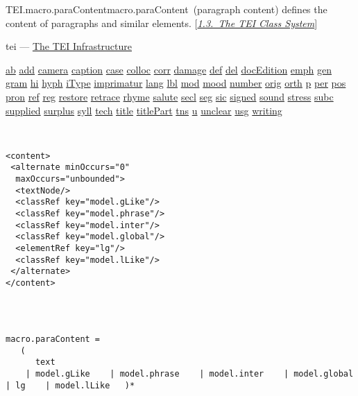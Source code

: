\begin{reflist}
\item[]\begin{specHead}{TEI.macro.paraContent}{macro.paraContent} (paragraph content) defines the content of paragraphs and similar elements. [\textit{\hyperref[STEC]{1.3.\ The TEI Class System}}]\end{specHead} 
    \item[{Module}]
  tei — \hyperref[ST]{The TEI Infrastructure}
    \item[{Used by}]
  \hyperref[TEI.ab]{ab} \hyperref[TEI.add]{add} \hyperref[TEI.camera]{camera} \hyperref[TEI.caption]{caption} \hyperref[TEI.case]{case} \hyperref[TEI.colloc]{colloc} \hyperref[TEI.corr]{corr} \hyperref[TEI.damage]{damage} \hyperref[TEI.def]{def} \hyperref[TEI.del]{del} \hyperref[TEI.docEdition]{docEdition} \hyperref[TEI.emph]{emph} \hyperref[TEI.gen]{gen} \hyperref[TEI.gram]{gram} \hyperref[TEI.hi]{hi} \hyperref[TEI.hyph]{hyph} \hyperref[TEI.iType]{iType} \hyperref[TEI.imprimatur]{imprimatur} \hyperref[TEI.lang]{lang} \hyperref[TEI.lbl]{lbl} \hyperref[TEI.mod]{mod} \hyperref[TEI.mood]{mood} \hyperref[TEI.number]{number} \hyperref[TEI.orig]{orig} \hyperref[TEI.orth]{orth} \hyperref[TEI.p]{p} \hyperref[TEI.per]{per} \hyperref[TEI.pos]{pos} \hyperref[TEI.pron]{pron} \hyperref[TEI.ref]{ref} \hyperref[TEI.reg]{reg} \hyperref[TEI.restore]{restore} \hyperref[TEI.retrace]{retrace} \hyperref[TEI.rhyme]{rhyme} \hyperref[TEI.salute]{salute} \hyperref[TEI.secl]{secl} \hyperref[TEI.seg]{seg} \hyperref[TEI.sic]{sic} \hyperref[TEI.signed]{signed} \hyperref[TEI.sound]{sound} \hyperref[TEI.stress]{stress} \hyperref[TEI.subc]{subc} \hyperref[TEI.supplied]{supplied} \hyperref[TEI.surplus]{surplus} \hyperref[TEI.syll]{syll} \hyperref[TEI.tech]{tech} \hyperref[TEI.title]{title} \hyperref[TEI.titlePart]{titlePart} \hyperref[TEI.tns]{tns} \hyperref[TEI.u]{u} \hyperref[TEI.unclear]{unclear} \hyperref[TEI.usg]{usg} \hyperref[TEI.writing]{writing}
    \item[{Content model}]
  \mbox{}\hfill\\[-10pt]\begin{Verbatim}[fontsize=\small]
<content>
 <alternate minOccurs="0"
  maxOccurs="unbounded">
  <textNode/>
  <classRef key="model.gLike"/>
  <classRef key="model.phrase"/>
  <classRef key="model.inter"/>
  <classRef key="model.global"/>
  <elementRef key="lg"/>
  <classRef key="model.lLike"/>
 </alternate>
</content>
    
\end{Verbatim}

    \item[{Declaration}]
  \mbox{}\hfill\\[-10pt]\begin{Verbatim}[fontsize=\small]
macro.paraContent =
   (
      text
    | model.gLike    | model.phrase    | model.inter    | model.global    | lg    | model.lLike   )*
\end{Verbatim}

\end{reflist}  
